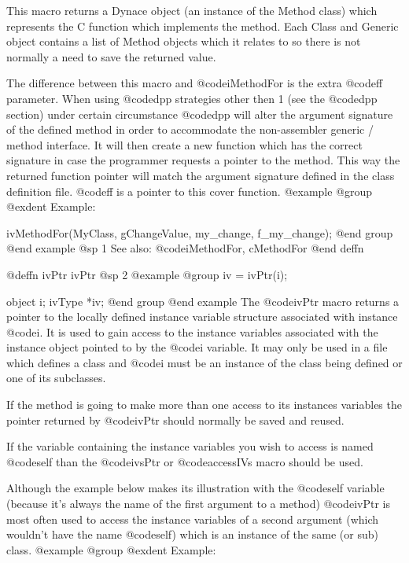 {{{{This macro returns a Dynace object (an instance of the Method class) which
represents the C function which implements the method.  Each Class 
and Generic object contains a list of Method objects which it relates
to so there is not normally a need to save the returned value.

The difference between this macro and @code{iMethodFor} is the extra @code{ff}
parameter.  When using @code{dpp} strategies other then 1 (see the @code{dpp}
section) under certain circumstance @code{dpp} will alter the argument
signature of the defined method in order to accommodate the non-assembler
generic / method interface.  It will then create a new function which has
the correct signature in case the programmer requests a pointer to the
method.  This way the returned function pointer will match the argument
signature defined in the class definition file.  @code{ff} is a pointer
to this cover function.
@example
@group
@exdent Example:

ivMethodFor(MyClass, gChangeValue, my_change, f_my_change);
@end group
@end example
@sp 1
See also:  @code{iMethodFor, cMethodFor}
@end deffn
















@deffn {ivPtr} ivPtr
@sp 2
@example
@group
iv = ivPtr(i);

object  i;
ivType  *iv;
@end group
@end example
The @code{ivPtr} macro returns a pointer to the locally defined
instance variable structure associated with instance @code{i}.  It is
used to gain access to the instance variables associated with the
instance object pointed to by the @code{i} variable.  It may only be
used in a file which defines a class and @code{i} must be an instance
of the class being defined or one of its subclasses.

If the method is going to make more than one access to its instances
variables the pointer returned by @code{ivPtr} should normally be saved
and reused.

If the variable containing the instance variables you wish to access is
named @code{self} than the @code{ivsPtr} or @code{accessIVs} macro
should be used.

Although the example below makes its illustration with the @code{self}
variable (because it's always the name of the first argument to a
method) @code{ivPtr} is most often used to access the instance variables
of a second argument (which wouldn't have the name @code{self}) which is
an instance of the same (or sub) class.
@example
@group
@exdent Example:

}}}}
